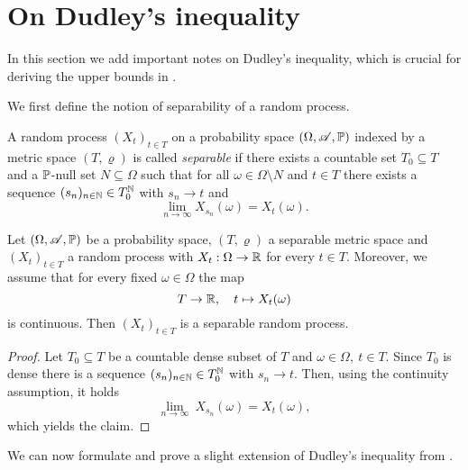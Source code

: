 
\section{On Dudley's inequality} \label{app:dudley}

In this section we add important notes on Dudley's inequality,
which is crucial for deriving the upper bounds in . 

We first define the notion of separability of a random process. 

\begin{definition}
A random process $(X_t)_{t \in T}$ on a probability space $(\Omega, \mathscr{A}, \mathbb{P})$ indexed by a metric space $(T, \varrho)$
is called \emph{separable} if there exists a countable set $T_0 \subseteq T$ and a $\mathbb{P}$-null set $N \subseteq \Omega$
such that for all $\omega \in \Omega \setminus N$
and $t \in T$ there exists a sequence $(s_n)_{n \in \mathbb{N}} \in T_0^{\mathbb{N}}$
with $s_n \to t$ and 
\begin{equation*}
\lim_{n  \to \infty} X_{s_n}(\omega) = X_t(\omega).
\end{equation*} 
\end{definition}

\begin{proposition} \label{prop:equal}
Let $(\Omega, \mathscr{A}, \mathbb{P})$ be a probability space, $(T, \varrho)$ a separable metric space and $(X_t)_{t \in T}$ a random process with $X_t: \Omega \to \mathbb{R}$ for every $t \in T$. Moreover, we assume that for every fixed $\omega \in \Omega$ the map
\begin{equation*}
T \to \mathbb{R}, \quad t \mapsto X_t(\omega)
\end{equation*}
is continuous. Then $(X_t)_{t \in T}$ is a separable random process. 
\end{proposition}

\newcommand{\T}{\widetilde{T}}
\begin{proof}
Let $T_0 \subseteq T$ be a countable dense subset of $T$ and $\omega \in \Omega, \ t \in T$.
Since $T_0$ is dense there is a sequence $(s_n)_{n \in \mathbb{N}} \in T_0^{\mathbb{N}}$ with $s_n \to t$.
Then, using the continuity assumption, it holds
\begin{equation*}
\lim_{n \to \infty} \ X_{s_n}(\omega) = X_t (\omega),
\end{equation*} 
which yields the claim.
\end{proof}

We can now formulate and prove a slight extension of Dudley's inequality from \cite{van2014probability}.

